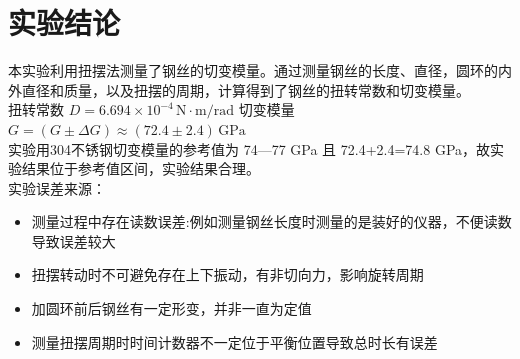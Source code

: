 \documentclass[12pt,a4paper]{article}
\begin{document}
	\section{实验结论}
	本实验利用扭摆法测量了钢丝的切变模量。通过测量钢丝的长度、直径，圆环的内外直径和质量，以及扭摆的周期，计算得到了钢丝的扭转常数和切变模量。\\
	扭转常数 $D = 6.694 \times 10^{-4}\,\mathrm{N\cdot m/rad}$ \qquad 切变模量 $G = (G \pm \Delta G) \approx (72.4\pm2.4) \,\text{GPa}$\\
	实验用304不锈钢切变模量的参考值为 74—77 GPa 且 72.4+2.4=74.8 GPa，故实验结果位于参考值区间，实验结果合理。\\
	实验误差来源：
	\begin{itemize}
		\item 测量过程中存在读数误差:例如测量钢丝长度时测量的是装好的仪器，不便读数导致误差较大
		\item 扭摆转动时不可避免存在上下振动，有非切向力，影响旋转周期
		\item 加圆环前后钢丝有一定形变，并非一直为定值
		\item 测量扭摆周期时时间计数器不一定位于平衡位置导致总时长有误差
	\end{itemize}	
	
\end{document}
